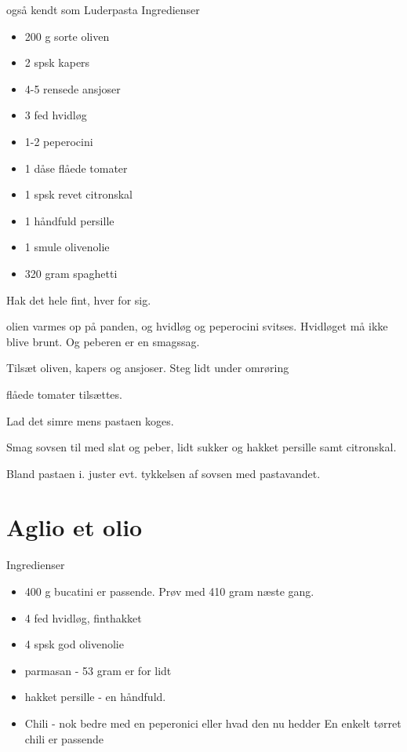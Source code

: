 \documentclass[
]{book}
\providecommand{\tightlist}{%
  \setlength{\itemsep}{0pt}\setlength{\parskip}{0pt}}
\begin{document}
også kendt som Luderpasta
Ingredienser

\begin{itemize}
\tightlist
\item
  200 g sorte oliven
\item
  2 spsk kapers
\item
  4-5 rensede ansjoser
\item
  3 fed hvidløg
\item
  1-2 peperocini
\item
  1 dåse flåede tomater
\item
  1 spsk revet citronskal
\item
  1 håndfuld persille
\item
  1 smule olivenolie
\item
  320 gram spaghetti
\end{itemize}

Hak det hele fint, hver for sig.

olien varmes op på panden, og hvidløg og peperocini svitses. Hvidløget må ikke blive brunt. Og peberen er en smagssag.

Tilsæt oliven, kapers og ansjoser. Steg lidt under omrøring

flåede tomater tilsættes.

Lad det simre mens pastaen koges.

Smag sovsen til med slat og peber, lidt sukker og hakket persille samt citronskal.

Bland pastaen i. juster evt. tykkelsen af sovsen med pastavandet.

\section{Aglio et olio}\label{aglio-et-olio}

Ingredienser

\begin{itemize}
\tightlist
\item
  400 g bucatini er passende. Prøv med 410 gram næste gang.
\item
  4 fed hvidløg, finthakket
\item
  4 spsk god olivenolie
\item
  parmasan - 53 gram er for lidt
\item
  hakket persille - en håndfuld.
\item
  Chili - nok bedre med en peperonici eller hvad den nu hedder En enkelt tørret chili er passende
\end{itemize}
\end{document}
